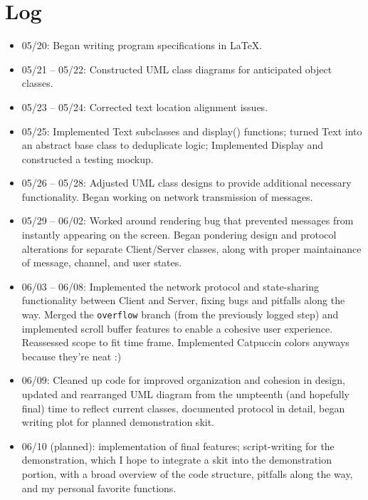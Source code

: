 \documentclass{article}
\begin{document}
\section{Log}
\begin{itemize}
    \item 05/20: Began writing program specifications in \LaTeX.
    \item 05/21 -- 05/22: Constructed UML class diagrams for anticipated object classes.
    \item 05/23 -- 05/24: Corrected text location alignment issues.
    \item 05/25: Implemented Text subclasses and display() functions; turned Text into an abstract base class to deduplicate logic; Implemented Display and constructed a testing mockup.
    \item 05/26 -- 05/28: Adjusted UML class designs to provide additional necessary functionality. Began working on network transmission of messages.
    \item 05/29 -- 06/02: Worked around rendering bug that prevented messages from instantly appearing on the screen. Began pondering design and protocol alterations for separate Client/Server classes, along with proper maintainance of message, channel, and user states.
    \item 06/03 -- 06/08: Implemented the network protocol and state-sharing functionality between Client and Server, fixing bugs and pitfalls along the way. Merged the \verb|overflow| branch (from the previously logged step) and implemented scroll buffer features to enable a cohesive user experience. Reassessed scope to fit time frame. Implemented Catpuccin colors anyways because they're neat :)
    \item 06/09: Cleaned up code for improved organization and cohesion in design, updated and rearranged UML diagram from the umpteenth (and hopefully final) time to reflect current classes, documented protocol in detail, began writing plot for planned demonstration skit.
    \item 06/10 (planned):  implementation of final features; script-writing for the demonstration, which I hope to integrate a skit into the demonstration portion, with a broad overview of the code structure, pitfalls along the way, and my personal favorite functions.
\end{itemize}
\end{document}
